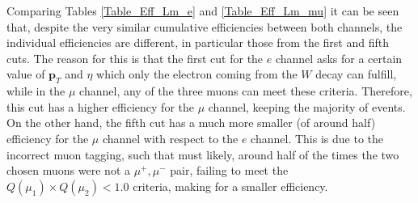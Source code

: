 \begin{table}[ht!]
\centering
\caption{Table of number of events ($\mathcal{N}$) of the five cuts applied to the events for the $W^{\pm} \rightarrow \mu, \nu_{\mu}$ channel for low $Z^{\prime}$ masses.}
\label{Table_Num_Lm_mu}
\end{table}

Comparing Tables \ref{Table_Eff_Lm_e} and \ref{Table_Eff_Lm_mu} it can be seen that, despite the very similar cumulative efficiencies between both channels, the individual efficiencies are different, in particular those from the first and fifth cuts. The reason for this is that the first cut for the $e$ channel asks for a certain value of $\bm{p}_T$ and $\eta$ which only the electron coming from the $W$ decay can fulfill, while in the $\mu$ channel, any of the three muons can meet these criteria. Therefore, this cut has a higher efficiency for the $\mu$ channel, keeping the majority of events. On the other hand, the fifth cut has a much more smaller (of around half) efficiency for the $\mu$ channel with respect to the $e$ channel. This is due to the incorrect muon tagging, such that must likely, around half of the times the two chosen muons were not a $\mu^+, \mu^-$ pair, failing to meet the $Q(\mu_1)\times Q(\mu_2) < 1.0$ criteria, making for a smaller efficiency.

